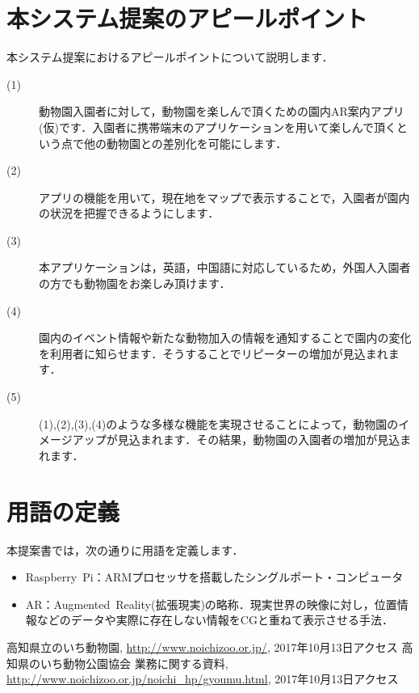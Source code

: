 \documentclass[a4j]{jarticle}
\begin{document}
\section{本システム提案のアピールポイント}
本システム提案におけるアピールポイントについて説明します．
\begin{description}
\item[(1)  ] 動物園入園者に対して，動物園を楽しんで頂くための園内AR案内アプリ(仮)です．入園者に携帯端末のアプリケーションを用いて楽しんで頂くという点で他の動物園との差別化を可能にします．
\item[(2)  ] アプリの機能を用いて，現在地をマップで表示することで，入園者が園内の状況を把握できるようにします．
\item[(3)  ] 本アプリケーションは，英語，中国語に対応しているため，外国人入園者の方でも動物園をお楽しみ頂けます．
\item[(4)  ] 園内のイベント情報や新たな動物加入の情報を通知することで園内の変化を利用者に知らせます．そうすることでリピーターの増加が見込まれます．
\item[(5)  ] (1),(2),(3),(4)のような多様な機能を実現させることによって，動物園のイメージアップが見込まれます．その結果，動物園の入園者の増加が見込まれます．
\end{description}

\section{用語の定義}
  本提案書では，次の通りに用語を定義します．
\begin{itemize}
\item Raspberry~Pi：ARMプロセッサを搭載したシングルポート・コンピュータ
\item AR：Augmented~Reality(拡張現実)の略称．現実世界の映像に対し，位置情報などのデータや実際に存在しない情報をCGと重ねて表示させる手法．
\end{itemize}


\begin{thebibliography}{9}
高知県立のいち動物園, \url{http://www.noichizoo.or.jp/}, 2017年10月13日アクセス  
  高知県のいち動物公園協会 業務に関する資料, \url{http://www.noichizoo.or.jp/noichi_hp/gyoumu.html}, 2017年10月13日アクセス

\end{thebibliography}
\end{document}
